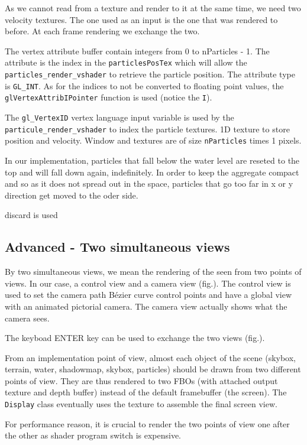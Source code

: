 \documentclass[a4paper,11pt]{article}
\begin{document}
As we cannot read from a texture and render to it at the same time, we need two velocity textures. The one used as an input is the one that was rendered to before. At each frame rendering we exchange the two.

The vertex attribute buffer contain integers from 0 to nParticles - 1. The attribute is the index in the \texttt{particlesPosTex} which will allow the \texttt{particles\_render\_vshader} to retrieve the particle position. The attribute type is \texttt{GL\_INT}. As for the indices to not be converted to floating point values, the \texttt{glVertexAttribIPointer} function is used (notice the \texttt{I}).

The \texttt{gl\_VertexID} vertex language input variable is used by the \texttt{particule\_render\_vshader} to index the particle textures.
1D texture to store position and velocity.
Window and textures are of size \texttt{nParticles} times 1 pixels.

In our implementation, particles that fall below the water level are reseted to the top and will fall down again, indefinitely. In order to keep the aggregate compact and so as it does not spread out in the space, particles that go too far in x or y direction get moved to the oder side.

discard is used

\subsection{Advanced - Two simultaneous views}

By two simultaneous views, we mean the rendering of the seen from two points of views. In our case, a control view and a camera view (fig.). The control view is used to set the camera path Bézier curve control points and have a global view with an animated pictorial camera. The camera view actually shows what the camera sees.

The keyboad ENTER key can be used to exchange the two views (fig.).

From an implementation point of view, almost each object of the scene (skybox, terrain, water, shadowmap, skybox, particles) should be drawn from two different points of view. They are thus rendered to two FBOs (with attached output texture and depth buffer) instead of the default framebuffer (the screen). The \texttt{Display} class eventually uses the texture to assemble the final screen view.

For performance reason, it is crucial to render the two points of view one after the other as shader program switch is expensive.
\end{document}
